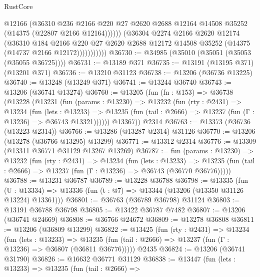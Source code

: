 \begin{lexlean}{RustCore}
\begin{coremodule}
                        @12166
                        (@36310
                          @236
                          @2166
                          @220
                          @27
                          @2620
                          @2688
                          @12164
                          @14508
                          @35252
                          (@14375 (@22807 @2166 @12164))))))
                  (@36304
                    @2274
                    @2166
                    @2620
                    @12174
                    (@36310
                      @184
                      @2166
                      @220
                      @27
                      @2620
                      @2688
                      @12172
                      @14508
                      @35252
                      (@14375 (@14737 @2166 @12172)))))))))))
@36730 := @34985 (@35010 (@35051 (@35053 (@35055 @36725))))
@36731 := @13189 @371
@36735 := @13191 (@13195 @371) (@13201 @371)
@36736 := @13210 @31123
@36738 := @13206 (@36736 @13225)
@36740 := @13248 (@13249 @371)
@36741 := @13244 @36740
@36743 := @13206 (@36741 @13274)
@36760 := @13205
    (fun (fn : @153) =>
    @36738
      (@13228
        (@13231
          (fun (params : @13230) =>
          @13232
            (fun (rty : @2431) =>
            @13234
              (fun (lets : @13233) =>
              @13235 (fun (tail : @2666) => @13237 (fun (Γ : @13236) => @36743 @13321))))))
        @13367))
    @2314
@36763 := @13373 (@36736 (@13223 @2314))
@36766 := @13286 (@13287 @2314) @31126
@36770 := @13206 (@13278 (@36766 @13295) @13299)
@36771 := @13312 @2314
@36776 := @13309 (@13311 @36771 @31129 @13267 @13269)
@36787 := fun (params : @13230) =>
  @13232
    (fun (rty : @2431) =>
    @13234
      (fun (lets : @13233) =>
      @13235 (fun (tail : @2666) => @13237 (fun (Γ : @13236) => @36743 (@36770 @36776)))))
@36788 := @13231 @36787
@36789 := @13228 @36788
@36798 := @13335
    (fun (U : @13334) => @13336 (fun (t : @7) => @13344 (@13206 (@13350 @31126 @13224) @13361)))
@36801 := @36763 (@36789 @36798) @31124
@36803 := @13191 @36788 @36798
@36805 := @13422 @36787 @7482
@36807 := @13206 (@36741 @24669)
@36808 := @36766 @24672
@36809 := @13278 @36808
@36811 := @13206 (@36809 @13299)
@36822 := @13425
    (fun (rty : @2431) =>
    @13234
      (fun (lets : @13233) =>
      @13235 (fun (tail : @2666) => @13237 (fun (Γ : @13236) => @36807 (@36811 @36776)))))
    @2435
@36824 := @13206 (@36741 @31790)
@36826 := @16632 @36771 @31129
@36838 := @13447
    (fun (lets : @13233) =>
    @13235
      (fun (tail : @2666) =>

\end{coremodule}
\end{lexlean}
